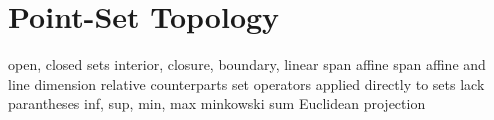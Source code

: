 \chapter{Point-Set Topology}
\label{chap:point_set_topology}

open, closed sets
interior, closure, boundary,
linear span 
affine span
affine and line dimension 
relative counterparts
set operators applied directly to sets lack parantheses 
inf, sup, min, max
minkowski sum
Euclidean projection
